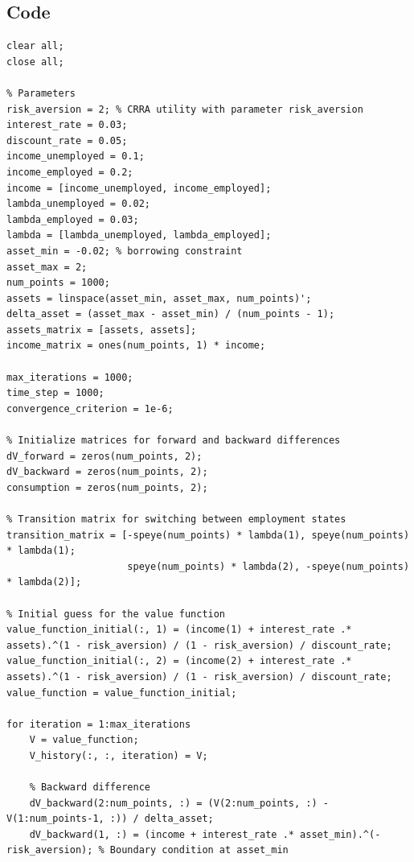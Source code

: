 \documentclass{article}
\begin{document}
\subsection*{Code}

\begin{lstlisting}
clear all;
close all;

% Parameters
risk_aversion = 2; % CRRA utility with parameter risk_aversion
interest_rate = 0.03; 
discount_rate = 0.05;
income_unemployed = 0.1;
income_employed = 0.2;
income = [income_unemployed, income_employed];
lambda_unemployed = 0.02;
lambda_employed = 0.03;
lambda = [lambda_unemployed, lambda_employed];
asset_min = -0.02; % borrowing constraint
asset_max = 2;
num_points = 1000;
assets = linspace(asset_min, asset_max, num_points)';
delta_asset = (asset_max - asset_min) / (num_points - 1);
assets_matrix = [assets, assets];
income_matrix = ones(num_points, 1) * income;

max_iterations = 1000;
time_step = 1000;
convergence_criterion = 1e-6;

% Initialize matrices for forward and backward differences
dV_forward = zeros(num_points, 2);
dV_backward = zeros(num_points, 2);
consumption = zeros(num_points, 2);

% Transition matrix for switching between employment states
transition_matrix = [-speye(num_points) * lambda(1), speye(num_points) * lambda(1); 
                     speye(num_points) * lambda(2), -speye(num_points) * lambda(2)];

% Initial guess for the value function
value_function_initial(:, 1) = (income(1) + interest_rate .* assets).^(1 - risk_aversion) / (1 - risk_aversion) / discount_rate;
value_function_initial(:, 2) = (income(2) + interest_rate .* assets).^(1 - risk_aversion) / (1 - risk_aversion) / discount_rate;
value_function = value_function_initial;

for iteration = 1:max_iterations
    V = value_function;
    V_history(:, :, iteration) = V;
    
    % Backward difference
    dV_backward(2:num_points, :) = (V(2:num_points, :) - V(1:num_points-1, :)) / delta_asset;
    dV_backward(1, :) = (income + interest_rate .* asset_min).^(-risk_aversion); % Boundary condition at asset_min


\end{lstlisting}
\end{document}
